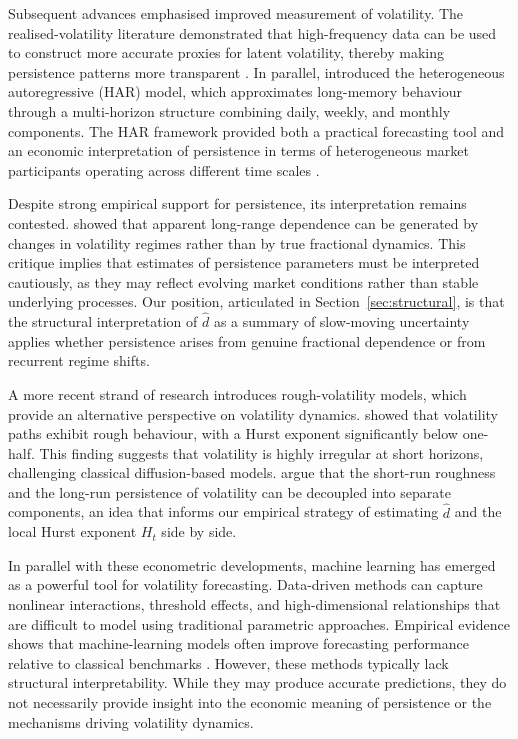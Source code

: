 \documentclass[11pt,a4paper]{article}
\newcommand{\dhat}{\hat d}
\begin{document}
Subsequent advances emphasised improved measurement of volatility. The
realised-volatility literature demonstrated that high-frequency data can
be used to construct more accurate proxies for latent volatility, thereby
making persistence patterns more transparent
\citep{andersen2003modeling,barndorff2002econometric}. In parallel,
\citet{corsi2009simple} introduced the heterogeneous autoregressive (HAR)
model, which approximates long-memory behaviour through a multi-horizon
structure combining daily, weekly, and monthly components. The HAR
framework provided both a practical forecasting tool and an economic
interpretation of persistence in terms of heterogeneous market participants
operating across different time scales \citep{muller1997volatilities}.

Despite strong empirical support for persistence, its interpretation
remains contested. \citet{mikosch2004nonstationarities} showed that
apparent long-range dependence can be generated by changes in volatility
regimes rather than by true fractional dynamics. This critique implies
that estimates of persistence parameters must be interpreted cautiously,
as they may reflect evolving market conditions rather than stable underlying
processes. Our position, articulated in
Section~\ref{sec:structural}, is that the structural interpretation of
$\dhat$ as a summary of slow-moving uncertainty applies whether persistence
arises from genuine fractional dependence or from recurrent regime shifts.

A more recent strand of research introduces rough-volatility models, which
provide an alternative perspective on volatility dynamics.
\citet{gatheral2018volatility} showed that volatility paths exhibit rough
behaviour, with a Hurst exponent significantly below one-half. This
finding suggests that volatility is highly irregular at short horizons,
challenging classical diffusion-based models. \citet{bennedsen2021decoupling}
argue that the short-run roughness and the long-run persistence of
volatility can be decoupled into separate components, an idea that
informs our empirical strategy of estimating $\dhat$ and the local Hurst
exponent $H_t$ side by side.

In parallel with these econometric developments, machine learning has
emerged as a powerful tool for volatility forecasting. Data-driven methods
can capture nonlinear interactions, threshold effects, and high-dimensional
relationships that are difficult to model using traditional parametric
approaches. Empirical evidence shows that machine-learning models often
improve forecasting performance relative to classical benchmarks
\citep{gu2020empirical,breiman2001random,friedman2001greedy,hastie2009elements}.
However, these methods typically lack structural interpretability. While
they may produce accurate predictions, they do not necessarily provide
insight into the economic meaning of persistence or the mechanisms driving
volatility dynamics.
\end{document}

